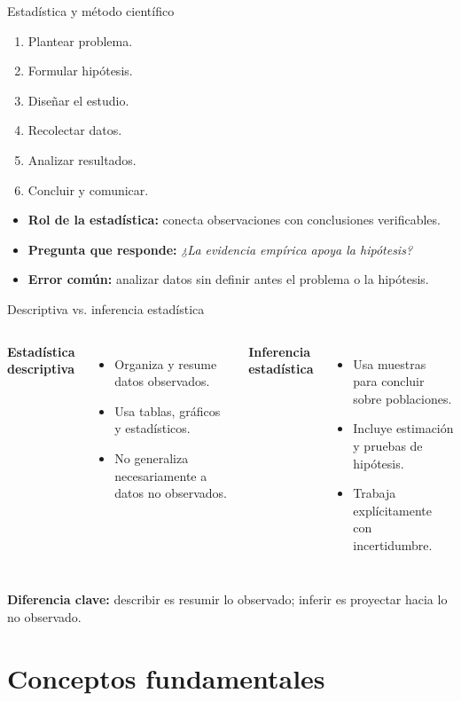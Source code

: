 \documentclass[aspectratio=169,11pt]{beamer}
\newcommand{\pregunta}[1]{\textbf{Pregunta que responde:} \emph{#1}}
\newcommand{\errorcomun}[1]{\textbf{Error común:} #1}
\newcommand{\diferencia}[1]{\textbf{Diferencia clave:} #1}
\begin{document}
\begin{frame}{Estadística y método científico}
\begin{enumerate}
  \item Plantear problema.
  \item Formular hipótesis.
  \item Diseñar el estudio.
  \item Recolectar datos.
  \item Analizar resultados.
  \item Concluir y comunicar.
\end{enumerate}
\begin{itemize}
  \item \textbf{Rol de la estadística:} conecta observaciones con conclusiones verificables.
  \item \pregunta{¿La evidencia empírica apoya la hipótesis?}
  \item \errorcomun{analizar datos sin definir antes el problema o la hipótesis.}
\end{itemize}
\end{frame}

\begin{frame}{Descriptiva vs. inferencia estadística}
\begin{columns}[T]
\textbf{Estadística descriptiva}
\begin{itemize}
  \item Organiza y resume datos observados.
  \item Usa tablas, gráficos y estadísticos.
  \item No generaliza necesariamente a datos no observados.
\end{itemize}
\textbf{Inferencia estadística}
\begin{itemize}
  \item Usa muestras para concluir sobre poblaciones.
  \item Incluye estimación y pruebas de hipótesis.
  \item Trabaja explícitamente con incertidumbre.
\end{itemize}
\end{columns}
\vspace{0.4em}
\diferencia{describir es resumir lo observado; inferir es proyectar hacia lo no observado.}
\end{frame}

\section{Conceptos fundamentales}
\end{document}
